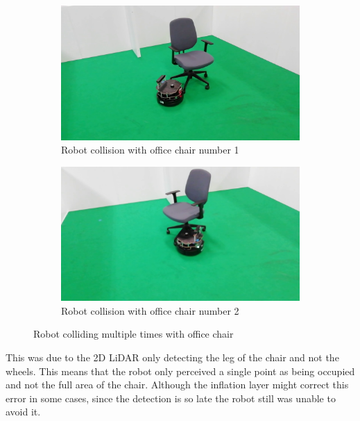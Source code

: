 \begin{figure}[h!]
  \centering
  \begin{subfigure}[b]{0.49\linewidth}
    \includegraphics[width=\linewidth]{imgs/chapter5/wchairLF.png}
     \caption{Robot collision with office chair number 1}
     \label{fig::wchair}
  \end{subfigure}
  \begin{subfigure}[b]{0.49\linewidth}
    \includegraphics[width=\linewidth]{imgs/chapter5/wchairLF2.png}
    \caption{Robot collision with office chair number 2}
    \label{fig::nchair}
  \end{subfigure}
  \caption{Robot colliding multiple times with office chair}
  \label{fig:wchairLF}
\end{figure}






This was due to the 2D \ac{LiDAR} only detecting the leg of the chair and not the wheels. This means that the robot only perceived a single point as being occupied and not the full area of the chair. Although the inflation layer  might correct this error in some cases, since the detection is so late the robot still was unable to avoid it.

